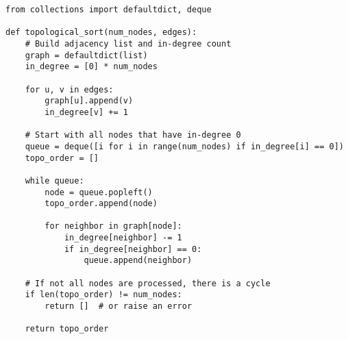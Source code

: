 \begin{algo}
\begin{lstlisting}
from collections import defaultdict, deque

def topological_sort(num_nodes, edges):
    # Build adjacency list and in-degree count
    graph = defaultdict(list)
    in_degree = [0] * num_nodes

    for u, v in edges:
        graph[u].append(v)
        in_degree[v] += 1

    # Start with all nodes that have in-degree 0
    queue = deque([i for i in range(num_nodes) if in_degree[i] == 0])
    topo_order = []

    while queue:
        node = queue.popleft()
        topo_order.append(node)

        for neighbor in graph[node]:
            in_degree[neighbor] -= 1
            if in_degree[neighbor] == 0:
                queue.append(neighbor)

    # If not all nodes are processed, there is a cycle
    if len(topo_order) != num_nodes:
        return []  # or raise an error

    return topo_order
\end{lstlisting}
        
\end{algo}